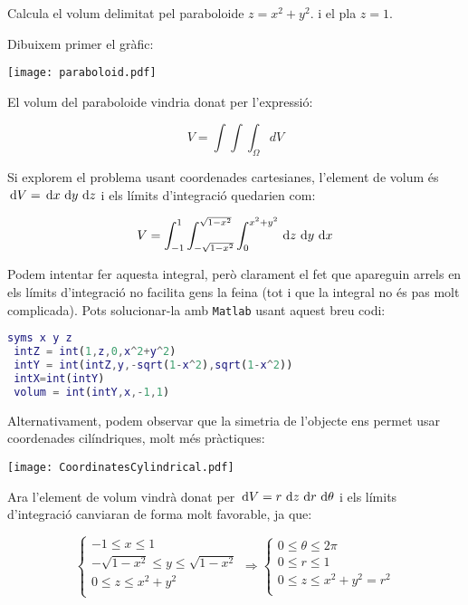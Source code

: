 \Exercise[title={Volum paraboloide}]

  Calcula el volum delimitat pel paraboloide $z=x^2+y^2$. i el pla $z=1$.


\Answer

Dibuixem primer el gràfic:

\begin{center}
  \texttt{[image: paraboloid.pdf]}
\end{center}

El volum del paraboloide vindria donat per l'expressió:

\[
  V=\int\int\int_{\Omega} dV 
\]

Si explorem el problema usant coordenades cartesianes, l'element de volum és $\, \mathop{}\!\mathrm{d} V= \, \mathop{}\!\mathrm{d} x \, \mathop{}\!\mathrm{d} y \, \mathop{}\!\mathrm{d} z$ i els límits d'integració quedarien com:

\[
  V=\int_{-1}^1  \int_{-\sqrt{1-x^2}}^{\sqrt{1-x^2}} \int_0^{x^2+y^2} \, \mathop{}\!\mathrm{d} z \, \mathop{}\!\mathrm{d} y \, \mathop{}\!\mathrm{d} x 
\]

Podem intentar fer aquesta integral, però clarament el fet que apareguin arrels en els límits d'integració no facilita gens la feina (tot i que la integral no és pas molt complicada). Pots solucionar-la amb \texttt{Matlab} usant aquest breu codi:
\begin{lstlisting}[language=Matlab]
 syms x y z
 intZ = int(1,z,0,x^2+y^2)
 intY = int(intZ,y,-sqrt(1-x^2),sqrt(1-x^2))
 intX=int(intY)
 volum = int(intY,x,-1,1)
\end{lstlisting}

Alternativament, podem observar que la simetria de l'objecte ens permet usar coordenades cilíndriques, molt més pràctiques:

\begin{center}
  \texttt{[image: CoordinatesCylindrical.pdf]}
\end{center}

Ara l'element de volum vindrà donat per $\, \mathop{}\!\mathrm{d} V = r \, \mathop{}\!\mathrm{d} z \, \mathop{}\!\mathrm{d} r \, \mathop{}\!\mathrm{d} \theta$ i els límits d'integració canviaran de forma molt favorable, ja que:

\[
\begin{cases}
  -1 \leq x \leq 1\\
  -\sqrt{1-x^2} \leq y \leq \sqrt{1-x^2} \\
  0 \leq z \leq x^2 + y^2\\
\end{cases}  
\Rightarrow
\begin{cases}
  0 \leq \theta \leq 2 \pi\\
  0 \leq r \leq 1 \\
  0 \leq z \leq x^2 + y^2 = r^2\\
\end{cases}  
\]

